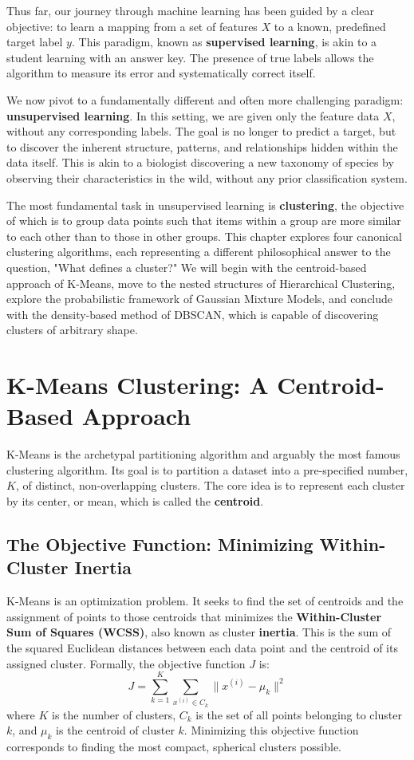 Thus far, our journey through machine learning has been guided by a clear objective: to learn a mapping from a set of features $X$ to a known, predefined target label $y$. This paradigm, known as \textbf{supervised learning}, is akin to a student learning with an answer key. The presence of true labels allows the algorithm to measure its error and systematically correct itself.

We now pivot to a fundamentally different and often more challenging paradigm: \textbf{unsupervised learning}. In this setting, we are given only the feature data $X$, without any corresponding labels. The goal is no longer to predict a target, but to discover the inherent structure, patterns, and relationships hidden within the data itself. This is akin to a biologist discovering a new taxonomy of species by observing their characteristics in the wild, without any prior classification system.

The most fundamental task in unsupervised learning is \textbf{clustering}, the objective of which is to group data points such that items within a group are more similar to each other than to those in other groups. This chapter explores four canonical clustering algorithms, each representing a different philosophical answer to the question, "What defines a cluster?" We will begin with the centroid-based approach of K-Means, move to the nested structures of Hierarchical Clustering, explore the probabilistic framework of Gaussian Mixture Models, and conclude with the density-based method of DBSCAN, which is capable of discovering clusters of arbitrary shape.

\section{K-Means Clustering: A Centroid-Based Approach}
\label{sec:kmeans}
K-Means is the archetypal partitioning algorithm and arguably the most famous clustering algorithm. Its goal is to partition a dataset into a pre-specified number, $K$, of distinct, non-overlapping clusters. The core idea is to represent each cluster by its center, or mean, which is called the \textbf{centroid}.

\subsection*{The Objective Function: Minimizing Within-Cluster Inertia}
K-Means is an optimization problem. It seeks to find the set of centroids and the assignment of points to those centroids that minimizes the \textbf{Within-Cluster Sum of Squares (WCSS)}, also known as cluster \textbf{inertia}. This is the sum of the squared Euclidean distances between each data point and the centroid of its assigned cluster. Formally, the objective function $J$ is:
$$ J = \sum_{k=1}^{K} \sum_{x^{(i)} \in C_k} \|x^{(i)} - \mu_k\|^2 $$
where $K$ is the number of clusters, $C_k$ is the set of all points belonging to cluster $k$, and $\mu_k$ is the centroid of cluster $k$. Minimizing this objective function corresponds to finding the most compact, spherical clusters possible.

